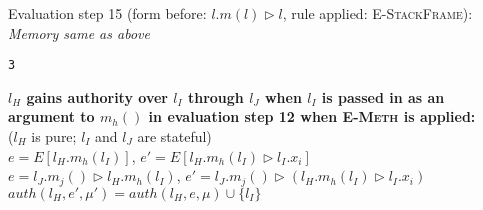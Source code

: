 \documentclass{llncs}
\begin{document}
\vspace{12pt}
\noindent Evaluation step 15 (form before: $l.m(l) \rhd l$, rule applied: \textsc{E-StackFrame}):\\
\vspace{-6pt}
\indent\textit{Memory same as above}\\
\vspace{-6pt}
\begin{lstlisting}[xleftmargin=20pt]
3
\end{lstlisting}


\newpage

\noindent\textbf{$l_H$ gains authority over $l_I$ through $l_J$ when $l_I$ is passed in as an argument to $m_h()$ in evaluation step 12 when \textsc{E-Meth} is applied:}\\

\noindent ($l_H$ is pure; $l_I$ and $l_J$ are stateful)\\

\noindent$e = E[l_H.m_h(l_I)]$, $e' = E[l_H.m_h(l_I) \rhd l_I.x_i]$\\

\noindent$e = l_J.m_j() \rhd l_H.m_h(l_I)$, $e' = l_J.m_j() \rhd (l_H.m_h(l_I) \rhd l_I.x_i)$\\

\noindent$auth(l_H, e', \mu') = auth(l_H, e, \mu) \cup \{ l_I \}$
\end{document}
